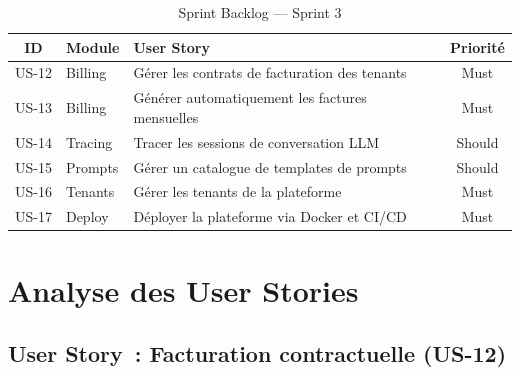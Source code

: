 \begin{table}[H]
\centering
\caption{Sprint Backlog --- Sprint 3}
\label{tab:sprint3_backlog}
\begin{tabularx}{\textwidth}{|c|l|X|c|}
\hline
\textbf{ID} & \textbf{Module} & \textbf{User Story} & \textbf{Priorité} \\
\hline
US-12 & Billing & Gérer les contrats de facturation des tenants & Must \\
\hline
US-13 & Billing & Générer automatiquement les factures mensuelles & Must \\
\hline
US-14 & Tracing & Tracer les sessions de conversation LLM & Should \\
\hline
US-15 & Prompts & Gérer un catalogue de templates de prompts & Should \\
\hline
US-16 & Tenants & Gérer les tenants de la plateforme & Must \\
\hline
US-17 & Deploy & Déployer la plateforme via Docker et CI/CD & Must \\
\hline
\end{tabularx}
\end{table}


\section{Analyse des User Stories}
\label{sec:s3_stories}

\subsection{User Story~: Facturation contractuelle (US-12)}

